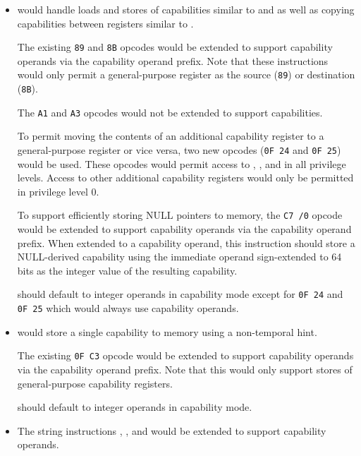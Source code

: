 \begin{itemize}
  \item {} would handle loads and stores of
    capabilities similar to  and  as well as
    copying capabilities between registers similar to .

    The existing \texttt{89} and \texttt{8B} opcodes would be extended
    to support capability operands via the capability operand prefix.
    Note that these instructions would only permit a general-purpose
    register as the source (\texttt{89}) or destination (\texttt{8B}).

    The \texttt{A1} and \texttt{A3} opcodes would not be extended to
    support capabilities.

    To permit moving the contents of an additional capability register
    to a general-purpose register or vice versa, two
    new opcodes (\texttt{0F 24} and \texttt{0F 25}) would be
    used.  These opcodes would permit access to \CFS{}, \CGS{}, and
    \DDC{} in all privilege levels.  Access to other additional
    capability registers would only be permitted in privilege level 0.

    To support efficiently storing NULL pointers to memory, the \texttt{C7 /0}
    opcode would be extended to support capability operands via
    the capability operand prefix.  When extended to a capability
    operand, this instruction should store a NULL-derived capability
    using the immediate operand sign-extended to 64 bits as the
    integer value of the resulting capability.

     should default to integer operands in capability
    mode except for \texttt{0F 24} and \texttt{0F 25} which would
    always use capability operands.

  \item {} would store a single capability to memory
    using a non-temporal hint.

    The existing \texttt{0F C3} opcode would be extended to support
    capability operands via the capability operand prefix.  Note that
    this would only support stores of general-purpose capability
    registers.

     should default to integer operands in
    capability mode.

  \item The string instructions , ,
    and  would be extended to support capability
    operands.


\end{itemize}
